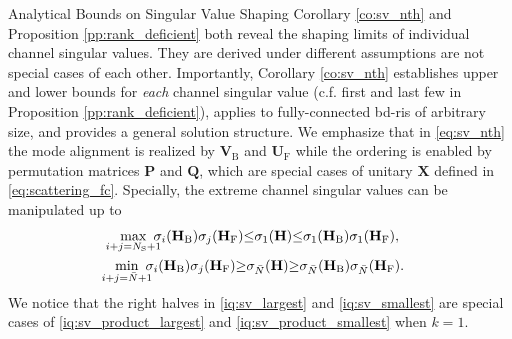 \begin{section}{Analytical Bounds on Singular Value Shaping}
	Corollary \ref{co:sv_nth} and Proposition \ref{pp:rank_deficient} both reveal the shaping limits of individual channel singular values.
	They are derived under different assumptions are not special cases of each other.
	Importantly, Corollary \ref{co:sv_nth} establishes upper and lower bounds for \emph{each} channel singular value (c.f. first and last few in Proposition \ref{pp:rank_deficient}), applies to fully-connected \gls{bd}-\gls{ris} of arbitrary size, and provides a general solution structure.
	We emphasize that in \eqref{eq:sv_nth} the mode alignment is realized by $\mathbf{V}_\mathrm{B}$ and $\mathbf{U}_\mathrm{F}$ while the ordering is enabled by permutation matrices $\mathbf{P}$ and $\mathbf{Q}$, which are special cases of unitary $\mathbf{X}$ defined in \eqref{eq:scattering_fc}.
	Specially, the extreme channel singular values can be manipulated up to
	\begin{subequations}
		\label{iq:sv_extreme}
		\begin{gather}
			\max_{\mathclap{i+j=N_\mathrm{S}+1}} \ \sigma_i(\mathbf{H}_\mathrm{B}) \sigma_j(\mathbf{H}_\mathrm{F}) {\le} \sigma_1(\mathbf{H}) {\le} \sigma_1(\mathbf{H}_\mathrm{B}) \sigma_1(\mathbf{H}_\mathrm{F}), \label{iq:sv_largest} \\
			\min_{\mathclap{i+j=\bar{N}+1}} \ \sigma_i(\mathbf{H}_\mathrm{B}) \sigma_j(\mathbf{H}_\mathrm{F}) {\ge} \sigma_{\bar{N}}(\mathbf{H}) {\ge} \sigma_{\bar{N}}(\mathbf{H}_\mathrm{B}) \sigma_{\bar{N}}(\mathbf{H}_\mathrm{F}). \label{iq:sv_smallest}
		\end{gather}
	\end{subequations}
	We notice that the right halves in \eqref{iq:sv_largest} and \eqref{iq:sv_smallest} are special cases of \eqref{iq:sv_product_largest} and \eqref{iq:sv_product_smallest} when $k=1$.


\end{section}
